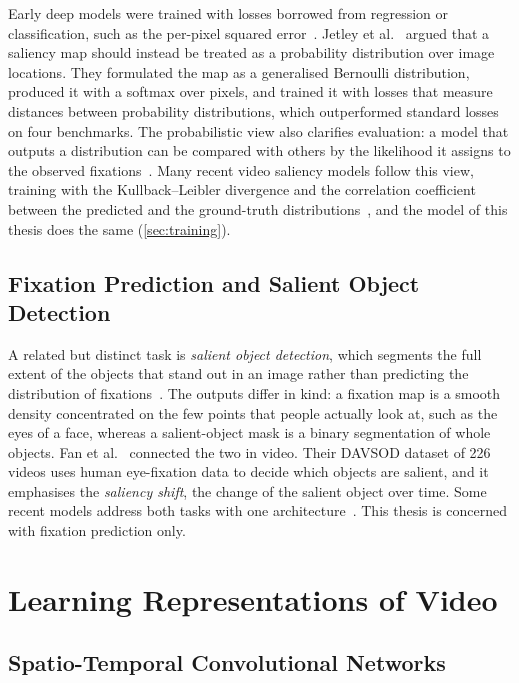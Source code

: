 Early deep models were trained with losses borrowed from regression or
classification, such as the per-pixel squared error~\cite{pan2016shallow}. Jetley et
al.~\cite{jetley2016end} argued that a saliency map should instead be treated as
a probability distribution over image locations. They formulated the map as a
generalised Bernoulli distribution, produced it with a softmax over pixels, and
trained it with losses that measure distances between probability
distributions, which outperformed standard losses on four benchmarks. The
probabilistic view also clarifies evaluation: a model that outputs a
distribution can be compared with others by the likelihood it assigns to the
observed fixations~\cite{kummerer2015information}. Many recent video saliency
models follow this view, training with the Kullback--Leibler divergence and the
correlation coefficient between the predicted and the ground-truth
distributions~\cite{moradi2024salfom,girmaji2025minimalistic}, and the model of
this thesis does the same (\cref{sec:training}).

\subsection{Fixation Prediction and Salient Object Detection}\label{sec:sod}

A related but distinct task is \emph{salient object detection}, which segments
the full extent of the objects that stand out in an image rather than predicting
the distribution of fixations~\cite{wang2022salient}. The outputs differ in kind:
a fixation map is a smooth density concentrated on the few points that people
actually look at, such as the eyes of a face, whereas a salient-object mask is a
binary segmentation of whole objects. Fan et al.~\cite{fan2019shifting} connected
the two in video. Their DAVSOD dataset of 226 videos uses human eye-fixation data
to decide which objects are salient, and it emphasises the \emph{saliency shift},
the change of the salient object over time. Some recent models address both
tasks with one architecture~\cite{xiong2025unist}. This thesis is concerned with
fixation prediction only.

\section{Learning Representations of Video}\label{sec:video-repr}

\subsection{Spatio-Temporal Convolutional Networks}

